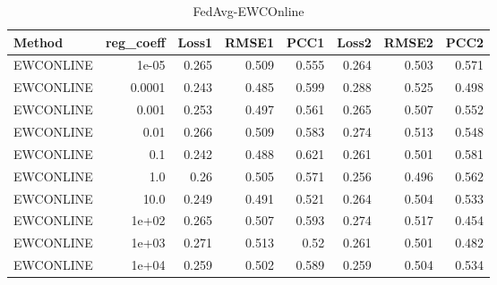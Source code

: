 \begin{table}
\caption{FedAvg-EWCOnline}
\begin{tabular}{lrrrrrrr}
\toprule
Method & reg_coeff & Loss1 & RMSE1 & PCC1 & Loss2 & RMSE2 & PCC2 \\
\midrule
EWCONLINE & 1e-05 & 0.265 & 0.509 & 0.555 & 0.264 & 0.503 & 0.571 \\
EWCONLINE & 0.0001 & 0.243 & 0.485 & 0.599 & 0.288 & 0.525 & 0.498 \\
EWCONLINE & 0.001 & 0.253 & 0.497 & 0.561 & 0.265 & 0.507 & 0.552 \\
EWCONLINE & 0.01 & 0.266 & 0.509 & 0.583 & 0.274 & 0.513 & 0.548 \\
EWCONLINE & 0.1 & 0.242 & 0.488 & 0.621 & 0.261 & 0.501 & 0.581 \\
EWCONLINE & 1.0 & 0.26 & 0.505 & 0.571 & 0.256 & 0.496 & 0.562 \\
EWCONLINE & 10.0 & 0.249 & 0.491 & 0.521 & 0.264 & 0.504 & 0.533 \\
EWCONLINE & 1e+02 & 0.265 & 0.507 & 0.593 & 0.274 & 0.517 & 0.454 \\
EWCONLINE & 1e+03 & 0.271 & 0.513 & 0.52 & 0.261 & 0.501 & 0.482 \\
EWCONLINE & 1e+04 & 0.259 & 0.502 & 0.589 & 0.259 & 0.504 & 0.534 \\
\bottomrule
\end{tabular}
\end{table}
